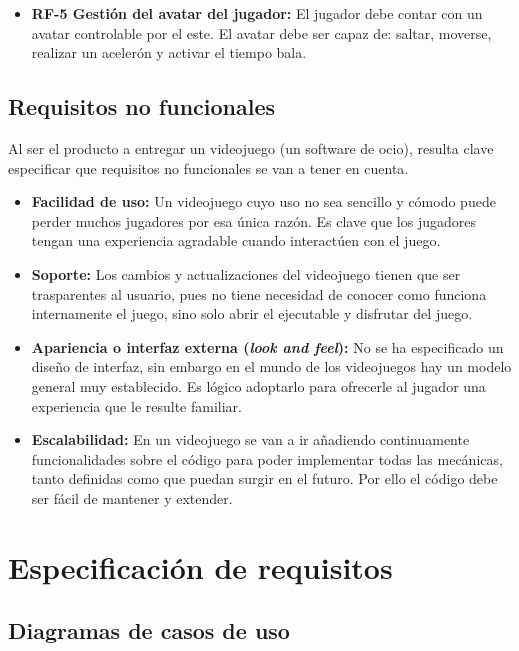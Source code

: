 \begin{itemize}
\item
\textbf{RF-5 Gestión del avatar del jugador:} El jugador debe contar con un avatar controlable por el este. El avatar debe ser capaz de: saltar, moverse, realizar un acelerón y activar el tiempo bala.
\end{itemize}

\subsection{Requisitos no funcionales}
Al ser el producto a entregar un videojuego (un software de ocio), resulta clave especificar que requisitos no funcionales se van a tener en cuenta.

\begin{itemize}
\item
\textbf{Facilidad de uso:} Un videojuego cuyo uso no sea sencillo y cómodo puede perder muchos jugadores por esa única razón. Es clave que los jugadores tengan una experiencia agradable cuando interactúen con el juego.

\item
\textbf{Soporte:} Los cambios y actualizaciones del videojuego tienen que ser trasparentes al usuario, pues no tiene necesidad de conocer como funciona internamente el juego, sino solo abrir el ejecutable y disfrutar del juego.

\item
\textbf{Apariencia o interfaz externa (\textit{look and feel}):} No se ha especificado un diseño de interfaz, sin embargo en el mundo de los videojuegos hay un modelo general muy establecido. Es lógico adoptarlo para ofrecerle al jugador una experiencia que le resulte familiar.

\item
\textbf{Escalabilidad:} En un videojuego se van a ir añadiendo continuamente funcionalidades sobre el código para poder implementar todas las mecánicas, tanto definidas como que puedan surgir en el futuro. Por ello el código debe ser fácil de mantener y extender.
\end{itemize}


\section{Especificación de requisitos}
\subsection{Diagramas de casos de uso}

